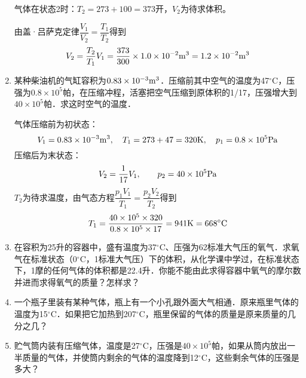 \begin{enumerate}
\begin{solution}
气体在状态2时：$T_2=273+100=373$开，$V_2$为待求体积。

由盖·吕萨克定律$\dfrac{V_1}{V_2}=\dfrac{T_1}{T_2}$得到
\[V_2=\frac{T_2}{T_1}V_1=\frac{373}{300}\times 1.0\times 10^{-2}{\rm m^3}=1.2\times 10^{-2}{\rm m^3}\]
\end{solution}
\item  某种柴油机的气缸容积为$0.83\times 10^{-3}{\rm m^3}$．压缩前其中空气的温度为47$^\circ$C，压强为$0.8\times 10^5$帕，在压缩冲程，活塞把空气压缩到原体积的1/17，压强增大到$40\times 10^5$帕．求这时空气的温度．

\begin{solution}
    气体压缩前为初状态：
\[V_1=0.83\times10^{-3}{\rm m^3},\quad T_1=273+47=320{\rm K},\quad p_1=0.8\times10^5{\rm Pa}\]
压缩后为末状态：
\[V_2=\frac{1}{17}V_1,\qquad  p_2=40\times10^5{\rm Pa}\]
$T_2$为待求温度，由气态方程$\dfrac{p_1V_1}{T_1}=\dfrac{p_2V_2}{T_2}$得到
\[T_1=\frac{40\times10^5\times320}{0.8\times10^5\times17}=941{\rm K}=668^{\circ}{\rm C}\]
\end{solution}
\item  在容积为25升的容器中，盛有温度为37$^\circ$C、压强为62标准大气压的氧气．求氧气在标准状态（0$^\circ$C，1标准大气压）下的体积，从化学课中学过，在标准状态下，1摩的任何气体的体积都是22.4升．你能不能由此求得容器中氧气的摩尔数并进而求得氧气的质量？怎样求？

\begin{solution}
    
\end{solution}
\item  一个瓶子里装有某种气体，瓶上有一个小孔跟外面大气相通．原来瓶里气体的温度为15$^\circ$C．如果把它加热到207$^\circ$C，瓶里保留的气体的质量是原来质量的几分之几？

\begin{solution}
    
\end{solution}
\item  贮气筒内装有压缩气体，温度是27$^\circ$C，压强是$40\times 10^5$帕，如果从筒内放出一半质量的气体，并使筒内剩余的气体的温度降到12$^\circ$C，这些剩余气体的压强是多大？


\begin{solution}
    
\end{solution}
\end{enumerate}











